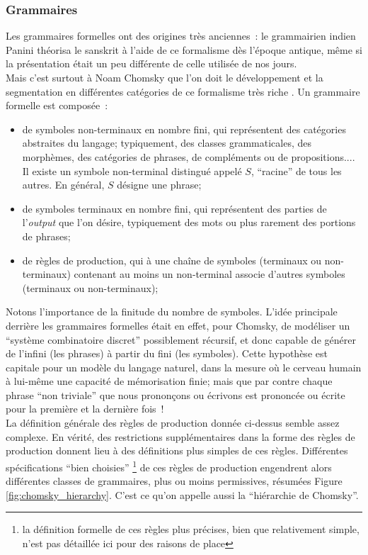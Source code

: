 \documentclass{article}
\begin{document}
			\subsubsection{Grammaires}
				Les grammaires formelles ont des origines très anciennes~: le grammairien indien Panini théorisa le sanskrit à l'aide de ce formalisme dès l'époque antique, même si la présentation était un peu différente de celle utilisée de nos jours.\\
				Mais c'est surtout à Noam Chomsky que l'on doit le développement et la segmentation en différentes catégories de ce formalisme très riche \cite{chomsky1956}. Un grammaire formelle est composée~:
				\begin{itemize}
					\item de symboles non-terminaux en nombre fini, qui représentent des catégories abstraites du langage; typiquement, des classes grammaticales, des morphèmes, des catégories de phrases, de compléments ou de propositions.... Il existe un symbole non-terminal distingué appelé $S$, ``racine'' de tous les autres. En général, $S$ désigne une phrase;
					\item de symboles terminaux en nombre fini, qui représentent des parties de l'\textit{output} que l'on désire, typiquement des mots ou plus rarement des portions de phrases;
					\item de règles de production, qui à une chaîne de symboles (terminaux ou non-terminaux) contenant au moins un non-terminal associe d'autres symboles (terminaux ou non-terminaux);
				\end{itemize}
				Notons l'importance de la finitude du nombre de symboles. L'idée principale derrière les grammaires formelles était en effet, pour Chomsky, de modéliser un ``système combinatoire discret'' possiblement récursif, et donc capable de générer de l'infini (les phrases) à partir du fini (les symboles). Cette hypothèse est capitale pour un modèle du langage naturel, dans la mesure où le cerveau humain à lui-même une capacité de mémorisation finie; mais que par contre chaque phrase ``non triviale'' que nous prononçons ou écrivons est prononcée ou écrite pour la première et la dernière fois~!\\
				La définition générale des règles de production donnée ci-dessus semble assez complexe. En vérité, des restrictions supplémentaires dans la forme des règles de production donnent lieu à des définitions plus simples de ces règles. Différentes spécifications ``bien choisies'' \footnote{la définition formelle de ces règles plus précises, bien que relativement simple, n'est pas détaillée ici pour des raisons de place} de ces règles de production engendrent alors différentes classes de grammaires, plus ou moins permissives, résumées Figure \ref{fig:chomsky_hierarchy}. C'est ce qu'on appelle aussi la ``hiérarchie de Chomsky''.
\end{document}
